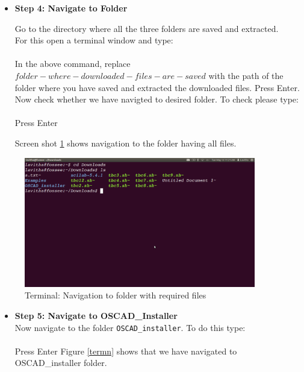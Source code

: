 \begin{itemize}
\item{\textbf{Step 4: Navigate to Folder}}

Go to the directory where all the three folders are saved and extracted.\\
For this open a terminal window and type:\\
{}\\ In the above command, replace $folder-where-downloaded-files-are-saved$ with the path of the folder where you have saved and extracted the downloaded files.
Press Enter.\\
Now check whether we have navigted to desired folder. To check please type:\\
\\
Press Enter


Screen shot \ref{Terminalc} shows navigation to the folder having all files.
\end{itemize}
\begin{figure}[h!]
\centering
\includegraphics[width=0.9\textwidth]{figures/install0.png}
\caption{Terminal: Navigation to folder with required files}
\label{Terminalc}
\end{figure}
\newpage
\begin{itemize}
\item{\textbf{Step 5: Navigate to OSCAD\_Installer}}\\
Now navigate to the folder {\tt OSCAD\_installer}. To do this type:\\
{}\\
Press Enter
\newline
Figure \ref{termn} shows that we have navigated to OSCAD\_installer folder.
\end{itemize}
